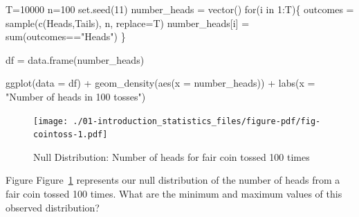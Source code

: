 \documentclass[
  letterpaper,
  DIV=11,
  numbers=noendperiod]{scrreprt}
\newenvironment{Shaded}{\begin{snugshade}}{\end{snugshade}}
\newcommand{\AttributeTok}[1]{\textcolor[rgb]{0.40,0.45,0.13}{#1}}
\newcommand{\ControlFlowTok}[1]{\textcolor[rgb]{0.00,0.23,0.31}{#1}}
\newcommand{\DecValTok}[1]{\textcolor[rgb]{0.68,0.00,0.00}{#1}}
\newcommand{\FunctionTok}[1]{\textcolor[rgb]{0.28,0.35,0.67}{#1}}
\newcommand{\NormalTok}[1]{\textcolor[rgb]{0.00,0.23,0.31}{#1}}
\newcommand{\OtherTok}[1]{\textcolor[rgb]{0.00,0.23,0.31}{#1}}
\newcommand{\SpecialCharTok}[1]{\textcolor[rgb]{0.37,0.37,0.37}{#1}}
\newcommand{\StringTok}[1]{\textcolor[rgb]{0.13,0.47,0.30}{#1}}
\begin{document}
\begin{Shaded}
\begin{Highlighting}[]
\NormalTok{T}\OtherTok{=}\DecValTok{10000}
\NormalTok{n}\OtherTok{=}\DecValTok{100}
\FunctionTok{set.seed}\NormalTok{(}\DecValTok{11}\NormalTok{)}
\NormalTok{number\_heads }\OtherTok{=} \FunctionTok{vector}\NormalTok{()}
\ControlFlowTok{for}\NormalTok{(i }\ControlFlowTok{in} \DecValTok{1}\SpecialCharTok{:}\NormalTok{T)\{}
\NormalTok{outcomes }\OtherTok{=} \FunctionTok{sample}\NormalTok{(}\FunctionTok{c}\NormalTok{(}\StringTok{\textquotesingle{}Heads\textquotesingle{}}\NormalTok{,}\StringTok{\textquotesingle{}Tails\textquotesingle{}}\NormalTok{), n, }\AttributeTok{replace=}\NormalTok{T)}
\NormalTok{number\_heads[i] }\OtherTok{=} \FunctionTok{sum}\NormalTok{(outcomes}\SpecialCharTok{==}\StringTok{"Heads"}\NormalTok{)}
\NormalTok{\}}

\NormalTok{df }\OtherTok{=} \FunctionTok{data.frame}\NormalTok{(number\_heads)}

\FunctionTok{ggplot}\NormalTok{(}\AttributeTok{data =}\NormalTok{ df) }\SpecialCharTok{+}
  \FunctionTok{geom\_density}\NormalTok{(}\FunctionTok{aes}\NormalTok{(}\AttributeTok{x =}\NormalTok{ number\_heads)) }\SpecialCharTok{+} 
  \FunctionTok{labs}\NormalTok{(}\AttributeTok{x =} \StringTok{"Number of heads in 100 tosses"}\NormalTok{)}
\end{Highlighting}
\end{Shaded}

\begin{figure}[H]

{\centering \texttt{[image: ./01-introduction\_statistics\_files/figure-pdf/fig-cointoss-1.pdf]}

}

\caption{\label{fig-cointoss}Null Distribution: Number of heads for fair
coin tossed 100 times}

\end{figure}

Figure Figure~\ref{fig-cointoss} represents our null distribution of the
number of heads from a fair coin tossed 100 times. What are the minimum
and maximum values of this observed distribution?

\begin{Shaded}
\end{Shaded}
\end{document}
